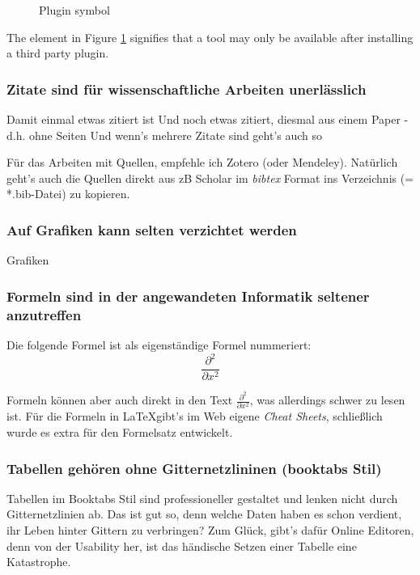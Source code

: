 \begin{figure}[h!] %
	\centering
	
	\caption{Plugin symbol}
	\label{fig:plugin_icon}
\end{figure}
The element in Figure \ref{fig:plugin_icon} signifies that a tool may only be available after installing a third party plugin.\newline


\subsubsection{Zitate sind für wissenschaftliche Arbeiten unerlässlich}
Damit einmal etwas zitiert ist \cite[S. 127ff.]{knuth1997}
Und noch etwas zitiert, diesmal aus einem Paper - d.h. ohne Seiten \cite{mcintosh1995}
Und wenn's mehrere Zitate sind geht's auch so \cite{mcintosh1995,knuth1997}

Für das Arbeiten mit Quellen, empfehle ich Zotero (oder Mendeley).
Natürlich geht's auch die Quellen direkt aus zB Scholar im \textit{bibtex} Format ins Verzeichnis (= *.bib-Datei) zu kopieren.

\cite{mcintosh1995,knuth1997, granville1992}

\subsubsection{Auf Grafiken kann selten verzichtet werden}
Grafiken



\subsubsection{Formeln sind in der angewandeten Informatik seltener anzutreffen}
Die folgende Formel ist als eigenständige Formel nummeriert:
\begin{equation}
	\frac{\partial^2 }{\partial x^2}  %
\end{equation}


Formeln können aber auch direkt in den Text $\frac{\partial^2 }{\partial x^2}$, was allerdings schwer zu lesen ist.
Für die Formeln in \LaTeX gibt's im Web eigene \textit{Cheat Sheets}, schließlich wurde es extra für den Formelsatz entwickelt.


\subsubsection{Tabellen gehören ohne Gitternetzlininen (booktabs Stil)}
Tabellen im Booktabs Stil sind professioneller gestaltet und lenken nicht durch Gitternetzlinien ab. Das ist gut so, denn welche Daten haben es schon verdient, ihr Leben hinter Gittern zu verbringen?
Zum Glück, gibt's dafür Online Editoren, denn von der Usability her, ist das händische Setzen einer Tabelle eine Katastrophe.

